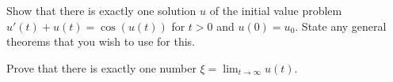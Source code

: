 \begin{alist}
\item Show that there is exactly one solution $u$ of the initial value
problem $u'(t)+u(t)=\cos(u(t))$ for $t>0$ and $u(0)=u_0$. State any
general theorems that you wish to use for this.
\item Prove that there is exactly one number $\xi=\lim_{t\rightarrow
\infty}u(t)$.
\end{alist}


